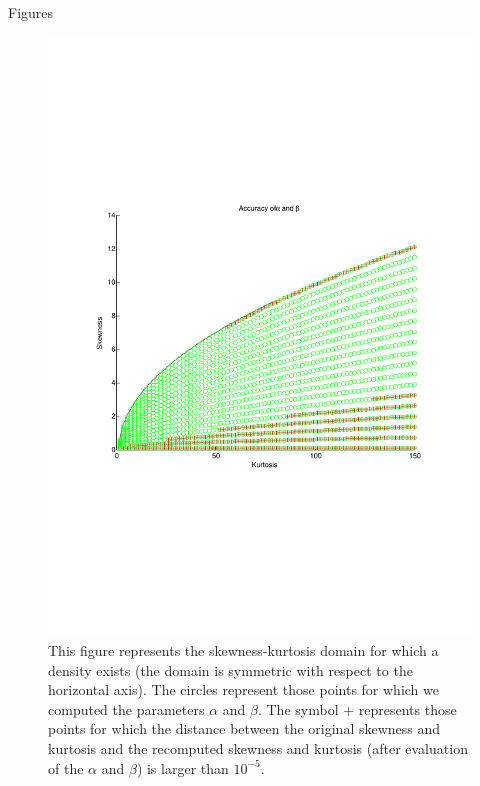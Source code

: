 \documentclass[a4paper, 12pt, oneside]{Thesis}
\begin{document}
\clearpage\newpage
\begin{center}
{\Huge Figures}
\end{center}


\begin{figure}[htbp]
\begin{center}
\includegraphics[trim= 1.5cm 7.5cm 1.cm 7.5cm,clip,scale=0.8
]{GautschiPrecisionHigh.pdf}
\caption{This figure represents the skewness-kurtosis domain for which a density exists (the domain is symmetric with respect to the horizontal axis). The circles represent those points for which we computed the parameters $\alpha$ and $\beta$. The symbol $+$ represents those points for which the distance between the original skewness and kurtosis and the recomputed skewness and kurtosis (after evaluation of the $\alpha$ and $\beta$) is larger than $10^{-5}$.}
\label{Fig_Domain}
\end{center}
\end{figure}
\end{document}
